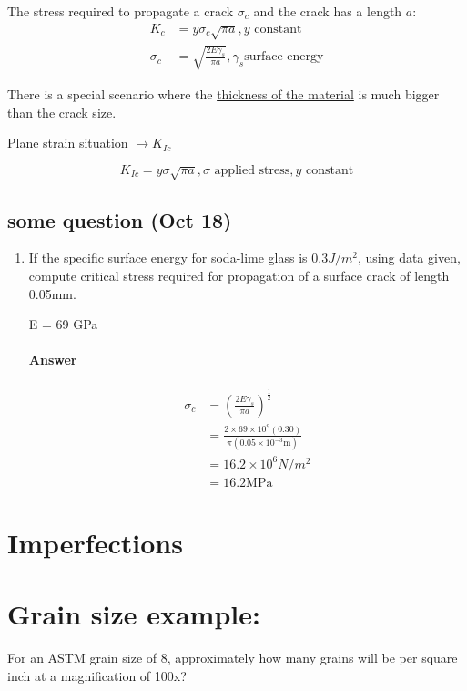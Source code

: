 \documentclass{article}
\begin{document}
The stress required to propagate a crack $\sigma_c$ and the crack has a length $a$:
\begin{align*}
    K_c &= y\sigma_c \sqrt{\pi a}, y \text{ constant }\\
    \sigma_c &= \sqrt{\frac{2E\gamma_s}{\pi a}}, \gamma_s \text{surface energy}
\end{align*}

There is a special scenario where the \underline{thickness of the material} is much bigger than the crack size.

Plane strain situation $\rightarrow K_{Ic}$

\begin{equation*}
    K_{Ic} = y\sigma\sqrt{\pi a}, \sigma \text{ applied stress}, y \textrm{ constant}
\end{equation*}

\subsection{some question (Oct 18)}

\begin{enumerate}
    \item If the specific surface energy for soda-lime glass is $0.3 \si{J/m^2}$, using data given, compute critical stress required for propagation of a surface crack of length 0.05\si{mm}.
    
    E = 69 GPa
    
    \paragraph{Answer} 
    \begin{align*}
        \sigma_c &= \left(\frac{2E\gamma_s}{\pi a}\right)^{\frac{1}{2}}\\
        &= \frac{2\times 69\times 10^9 (0.30)}{\pi(0.05\times10^{-3}\si\m)}\\
        &= 16.2 \times 10^6 \si{N/m^2}\\
        &= 16.2 \si\MPa
    \end{align*}
\end{enumerate}

\section{Imperfections}


\section{Grain size example:}
For an ASTM grain size of 8, approximately how many grains will be per square inch at a magnification of 100x?
\end{document}
